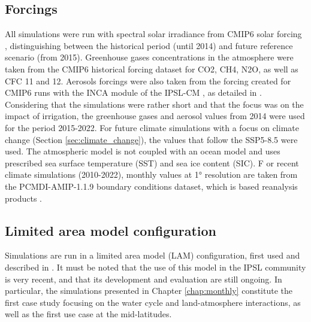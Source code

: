 \subsection{Forcings}

All simulations were run with spectral solar irradiance from CMIP6 solar forcing \citep{matthes_solar_2017}, distinguishing between the historical period (until 2014) and future reference scenario (from 2015).
Greenhouse gases concentrations in the atmosphere were taken from the CMIP6 historical forcing dataset for CO2, CH4, N2O, as well as CFC 11 and 12.
Aerosols forcings were also taken from the forcing created for CMIP6 runs with the INCA module of the IPSL-CM \citep{hauglustaine_global_2014}, as detailed in \citet{lurton_implementation_2020}.
Considering that the simulations were rather short and that the focus was on the impact of irrigation, the greenhouse gases and aerosol values from 2014 were used for the period 2015-2022. For future climate simulations with a focus on climate change (Section \ref{sec:climate_change}), the values that follow the SSP5-8.5 were used.
The atmospheric model is not coupled with an ocean model and uses prescribed sea surface temperature (SST) and sea ice content (SIC). F
or recent climate simulations (2010-2022), monthly values at 1° resolution are taken from the PCMDI-AMIP-1.1.9 boundary conditions dataset, which is based reanalysis products \citep{taylor_sea_2000, hurrell_new_2008}.

\subsection{Limited area model configuration}
Simulations are run in a limited area model (LAM) configuration, first used and described in \citet{raillard_leveraging_2024}. It must be noted that the use of this model in the IPSL community is very recent, and that its development and evaluation are still ongoing. In particular, the simulations presented in Chapter \ref{chap:monthly} constitute the first case study focusing on the water cycle and land-atmosphere interactions, as well as the first use case at the mid-latitudes.

